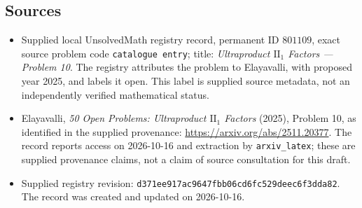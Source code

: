 \documentclass[11pt]{article}
\begin{document}
\subsection{Sources}
\begin{itemize}
\item Supplied local UnsolvedMath registry record, permanent ID $801109$, exact source problem code \texttt{catalogue entry}; title: \emph{Ultraproduct $\mathrm{II}_1$ Factors --- Problem 10}. The registry attributes the problem to Elayavalli, with proposed year 2025, and labels it open. This label is supplied source metadata, not an independently verified mathematical status.
\item Elayavalli, \emph{50 Open Problems: Ultraproduct $\mathrm{II}_1$ Factors} (2025), Problem 10, as identified in the supplied provenance: \url{https://arxiv.org/abs/2511.20377}. The record reports access on 2026-10-16 and extraction by \texttt{arxiv\_latex}; these are supplied provenance claims, not a claim of source consultation for this draft.
\item Supplied registry revision: \texttt{d371ee917ac9647fbb06cd6fc529deec6f3dda82}. The record was created and updated on 2026-10-16.
\end{itemize}
\end{document}
